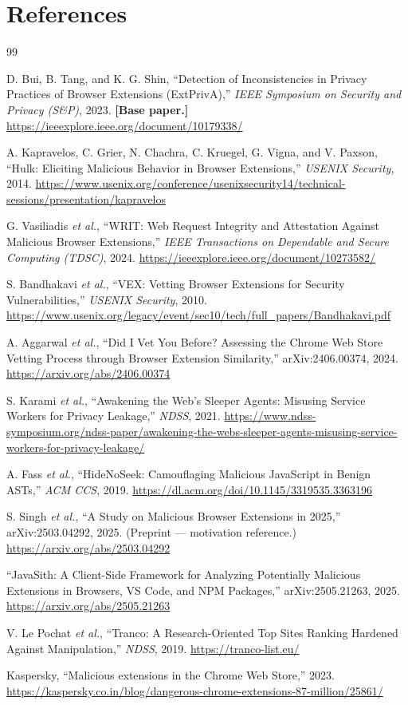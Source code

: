 \documentclass[11pt]{article}
\begin{document}
\section{References}
\begin{thebibliography}{99}
\setlength{\itemsep}{0.25em}

D. Bui, B. Tang, and K. G. Shin, ``Detection of Inconsistencies in Privacy Practices of Browser
Extensions (ExtPrivA),'' \emph{IEEE Symposium on Security and Privacy (S\&P)}, 2023.
\textbf{[Base paper.]}
\url{https://ieeexplore.ieee.org/document/10179338/}

A. Kapravelos, C. Grier, N. Chachra, C. Kruegel, G. Vigna, and V. Paxson, ``Hulk: Eliciting Malicious
Behavior in Browser Extensions,'' \emph{USENIX Security}, 2014.
\url{https://www.usenix.org/conference/usenixsecurity14/technical-sessions/presentation/kapravelos}

G. Vasiliadis \emph{et al.}, ``WRIT: Web Request Integrity and Attestation Against Malicious Browser
Extensions,'' \emph{IEEE Transactions on Dependable and Secure Computing (TDSC)}, 2024.
\url{https://ieeexplore.ieee.org/document/10273582/}

S. Bandhakavi \emph{et al.}, ``VEX: Vetting Browser Extensions for Security Vulnerabilities,''
\emph{USENIX Security}, 2010.
\url{https://www.usenix.org/legacy/event/sec10/tech/full_papers/Bandhakavi.pdf}

A. Aggarwal \emph{et al.}, ``Did I Vet You Before? Assessing the Chrome Web Store Vetting Process
through Browser Extension Similarity,'' arXiv:2406.00374, 2024.
\url{https://arxiv.org/abs/2406.00374}

S. Karami \emph{et al.}, ``Awakening the Web's Sleeper Agents: Misusing Service Workers for Privacy
Leakage,'' \emph{NDSS}, 2021.
\url{https://www.ndss-symposium.org/ndss-paper/awakening-the-webs-sleeper-agents-misusing-service-workers-for-privacy-leakage/}

A. Fass \emph{et al.}, ``HideNoSeek: Camouflaging Malicious JavaScript in Benign ASTs,''
\emph{ACM CCS}, 2019.
\url{https://dl.acm.org/doi/10.1145/3319535.3363196}

S. Singh \emph{et al.}, ``A Study on Malicious Browser Extensions in 2025,'' arXiv:2503.04292, 2025.
(Preprint --- motivation reference.)
\url{https://arxiv.org/abs/2503.04292}

``JavaSith: A Client-Side Framework for Analyzing Potentially Malicious Extensions in Browsers,
VS Code, and NPM Packages,'' arXiv:2505.21263, 2025.
\url{https://arxiv.org/abs/2505.21263}

V. Le Pochat \emph{et al.}, ``Tranco: A Research-Oriented Top Sites Ranking Hardened Against
Manipulation,'' \emph{NDSS}, 2019.
\url{https://tranco-list.eu/}

Kaspersky, ``Malicious extensions in the Chrome Web Store,'' 2023.
\url{https://kaspersky.co.in/blog/dangerous-chrome-extensions-87-million/25861/}

\end{thebibliography}
\end{document}
